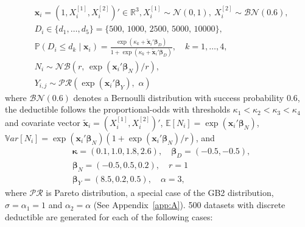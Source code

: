 \documentclass[11pt]{article}
\newcommand{\rev}[1]{{\color{blue}#1}}
\begin{document}
$$
\begin{aligned}
& \bm{x}_i = (1, X^{[1]}_{i}, X^{[2]}_{i})' \in \mathbb{R}^{3}, X^{[1]}_{i} \sim \mathcal{N}(0, 1), \ X^{[2]}_{i} \sim \mathcal{BN}(0.6), \\
& D_i \in \{d_1,\ldots,d_5\}=\{500,\, 1000,\, 2500,\, 5000,\, 10000\}, \\
&\mathbb{P}(D_i \le d_k \mid \bm{x}_i) = \frac{\exp(\kappa_k + \tilde{\bm{x}}_i'\bm{\beta}_D)}{1+\exp(\kappa_k + \tilde{\bm{x}}_i'\bm{\beta}_D)}, \quad k=1,\ldots,4, \\
&N_{i} \sim \mathcal{NB}(r,\,\exp(\bm{x}_i'\bm{\beta}_N)/ r), \\
&Y_{i,j} \sim \mathcal{PR}(\exp(\bm{x}_i'\bm{\beta}_Y), \, \,\alpha)
\end{aligned}
$$
where \rev{$\mathcal{BN}(0.6)$ denotes a Bernoulli distribution with success probability $0.6$,} \rev{the deductible follows the proportional-odds with thresholds $\kappa_1<\kappa_2<\kappa_3<\kappa_4$ and covariate vector $\tilde{\bm{x}}_i=(X^{[1]}_{i}, X^{[2]}_{i})'$,} $\mathbb{E}[N_i]=\exp(\bm{x}_i'\bm{\beta}_N)$, \rev{$\mathbb{V}ar[N_i]= \exp(\bm{x}_i'\bm{\beta}_N) \left(1+\exp(\bm{x}_i'\bm{\beta}_N)/r\right)$}, and
$$
\begin{aligned}
&\bm{\kappa} = (0.1, 1.0, 1.8, 2.6), \quad \bm{\beta}_D = (-0.5, -0.5), \\
&\bm{\beta}_N = (-0.5, 0.5, 0.2),\quad r=1\\
&\bm{\beta}_Y = (8.5, 0.2, 0.5),\quad \alpha=3,
\end{aligned}
$$
where $\mathcal{PR}$ is Pareto distribution, a special case of the GB2 distribution, $\sigma=\alpha_1=1$ and $\alpha_2=\alpha$ (See Appendix~\ref{app:A}). 500 datasets with discrete deductible are generated for each of the following cases:
\end{document}
